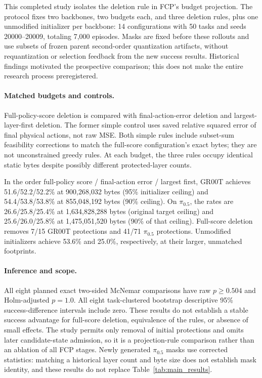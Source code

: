 This completed study isolates the deletion rule in FCP's budget projection. The protocol fixes two backbones, two budgets each, and three deletion rules, plus one unmodified initializer per backbone: 14 configurations with 50 tasks and seeds 20000--20009, totaling 7,000 episodes. Masks are fixed before these rollouts and use subsets of frozen parent second-order quantization artifacts, without requantization or selection feedback from the new success results. Historical findings motivated the prospective comparison; this does not make the entire research process preregistered.

\paragraph{Matched budgets and controls.}
Full-policy-score deletion is compared with final-action-error deletion and largest-layer-first deletion. The former simple control uses saved relative squared error of final physical actions, not raw MSE. Both simple rules include subset-sum feasibility corrections to match the full-score configuration's exact bytes; they are not unconstrained greedy rules. At each budget, the three rules occupy identical static bytes despite possibly different protected-layer counts.

In the order full-policy score / final-action error / largest first, GR00T achieves 51.6/52.2/52.2\% at 900,268,032 bytes (95\% initializer ceiling) and 54.4/53.8/53.8\% at 855,048,192 bytes (90\% ceiling). On $\pi_{0.5}$, the rates are 26.6/25.8/25.4\% at 1,634,828,288 bytes (original target ceiling) and 25.6/26.0/25.8\% at 1,475,051,520 bytes (90\% of that ceiling). Full-score deletion removes 7/15 GR00T protections and 41/71 $\pi_{0.5}$ protections. Unmodified initializers achieve 53.6\% and 25.0\%, respectively, at their larger, unmatched footprints.

\paragraph{Inference and scope.}
All eight planned exact two-sided McNemar comparisons have raw $p\ge0.504$ and Holm-adjusted $p=1.0$. All eight task-clustered bootstrap descriptive 95\% success-difference intervals include zero. These results do not establish a stable success advantage for full-score deletion, equivalence of the rules, or absence of small effects. The study permits only removal of initial protections and omits later candidate-state admission, so it is a projection-rule comparison rather than an ablation of all FCP stages. Newly generated $\pi_{0.5}$ masks use corrected statistics: matching a historical layer count and byte size does not establish mask identity, and these results do not replace Table~\ref{tab:main_results}.

